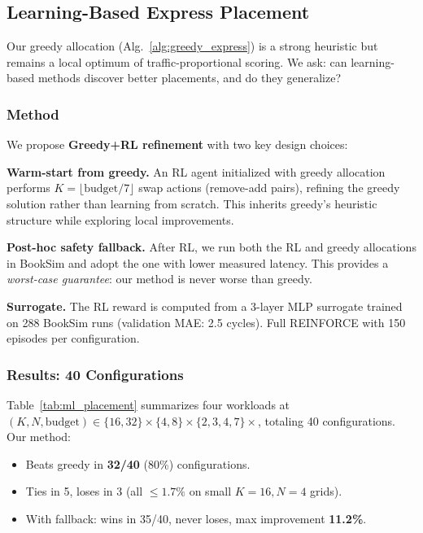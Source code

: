 
\subsection{Learning-Based Express Placement}
\label{sec:ml_placement}

Our greedy allocation (Alg.~\ref{alg:greedy_express}) is a strong heuristic
but remains a local optimum of traffic-proportional scoring. We ask: can
learning-based methods discover better placements, and do they generalize?

\subsubsection{Method}

We propose \textbf{Greedy+RL refinement} with two key design choices:

\noindent\textbf{Warm-start from greedy.} An RL agent initialized with greedy
allocation performs $K = \lfloor \text{budget}/7 \rfloor$ swap actions
(remove-add pairs), refining the greedy solution rather than learning from
scratch. This inherits greedy's heuristic structure while exploring local
improvements.

\noindent\textbf{Post-hoc safety fallback.} After RL, we run both the RL and
greedy allocations in BookSim and adopt the one with lower measured latency.
This provides a \emph{worst-case guarantee}: our method is never worse than
greedy.

\noindent\textbf{Surrogate.} The RL reward is computed from a 3-layer MLP
surrogate trained on 288 BookSim runs (validation MAE: 2.5 cycles). Full
REINFORCE with 150 episodes per configuration.

\subsubsection{Results: 40 Configurations}

Table~\ref{tab:ml_placement} summarizes four workloads at
$(K, N, \text{budget}) \in \{16, 32\} \times \{4, 8\} \times \{2, 3, 4, 7\}\times$,
totaling 40 configurations. Our method:
\begin{itemize}
  \item Beats greedy in \textbf{32/40} (80\%) configurations.
  \item Ties in 5, loses in 3 (all $\le 1.7\%$ on small $K{=}16, N{=}4$ grids).
  \item With fallback: wins in 35/40, never loses, max improvement \textbf{11.2\%}.
\end{itemize}

